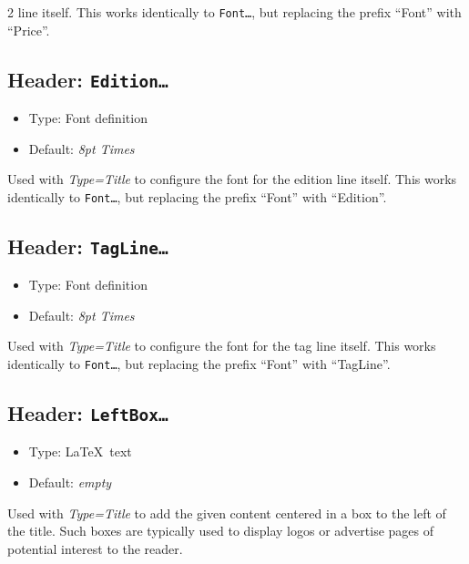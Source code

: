 \documentclass[a4paper,DIV=11]{scrartcl}
\newcommand{\property}[5]{
  \subsection{#1: \texttt{#2}}
  \begin{itemize}
  \item Type: #3
  \item Default: #4
  \end{itemize}
  #5
}
\newcommand{\header}{\property{Header}}
\begin{document}
\begin{multicols}{2}
{  line itself. This works identically to \texttt{Font\dots}, but
  replacing the prefix ``Font'' with ``Price''.
}
\header{Edition\dots}{Font definition}{\textit{8pt Times}}{
  Used with \textit{Type=Title} to configure the font for the edition
  line itself. This works identically to \texttt{Font\dots}, but
  replacing the prefix ``Font'' with ``Edition''.
}
\header{TagLine\dots}{Font definition}{\textit{8pt Times}}{
  Used with \textit{Type=Title} to configure the font for the tag
  line itself. This works identically to \texttt{Font\dots}, but
  replacing the prefix ``Font'' with ``TagLine''.
}
\header{LeftBox\dots}{\LaTeX\ text}{\textit{empty}}{
  Used with \textit{Type=Title} to add the given content centered in a
  box to the left of the title. Such boxes are typically used to
  display logos or advertise pages of potential interest to the
  reader.

}
\end{multicols}
\end{document}
